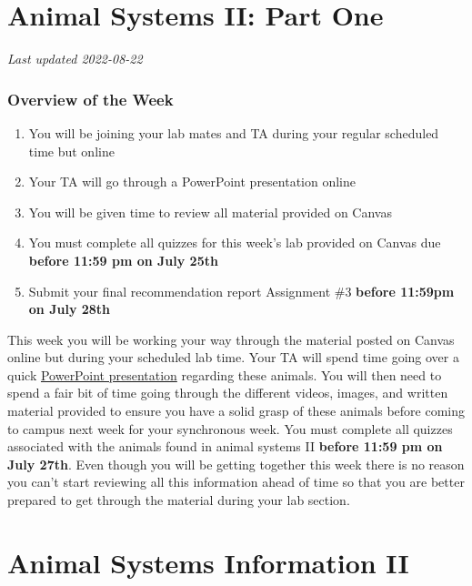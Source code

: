 \documentclass[
]{book}
\providecommand{\tightlist}{%
  \setlength{\itemsep}{0pt}\setlength{\parskip}{0pt}}
\begin{document}
\hypertarget{animal-systems-ii-part-one}{%
\chapter*{Animal Systems II: Part One}\label{animal-systems-ii-part-one}}

\emph{Last updated 2022-08-22}

\hypertarget{overview-of-the-week-2}{%
\subsection*{Overview of the Week}\label{overview-of-the-week-2}}

\begin{enumerate}
\def\labelenumi{\arabic{enumi}.}
\tightlist
\item
  You will be joining your lab mates and TA during your regular scheduled time but online
\item
  Your TA will go through a PowerPoint presentation online
\item
  You will be given time to review all material provided on Canvas
\item
  You must complete all quizzes for this week's lab provided on Canvas due \textbf{before 11:59 pm on July 25th}
\item
  Submit your final recommendation report Assignment \#3 \textbf{before 11:59pm on July 28th}
\end{enumerate}

This week you will be working your way through the material posted on Canvas online but during your scheduled lab time. Your TA will spend time going over a quick \href{files/Animal_Systems_Presentation_II.pptx}{PowerPoint presentation} regarding these animals. You will then need to spend a fair bit of time going through the different videos, images, and written material provided to ensure you have a solid grasp of these animals before coming to campus next week for your synchronous week. You must complete all quizzes associated with the animals found in animal systems II \textbf{before 11:59 pm on July 27th}. Even though you will be getting together this week there is no reason you can't start reviewing all this information ahead of time so that you are better prepared to get through the material during your lab section.

\hypertarget{animal-systems-information-ii}{%
\chapter*{Animal Systems Information II}\label{animal-systems-information-ii}}
\end{document}
